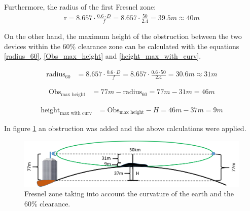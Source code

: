 Furthermore, the radius of the first Fresnel zone:
\begin{align*}
\text{r} = 8.657\cdot \frac{0.6\cdot D}{f} = 8.657\cdot \frac{50}{2.4} = 39.5m \approx 40m 
\end{align*}

On the other hand, the maximum height of the obstruction between the two devices within the 60$\%$ clearance zone can be calculated with the equations \ref{radius_60}, \ref{Obs_max_height} and \ref{height_max_with_curv}.

\begin{align}
\text{radius}_{60} &= 8.657\cdot \frac{0.6\cdot D}{f} = 8.657\cdot \frac{0.6\cdot 50}{2.4} = 30.6m \approx 31m \label{radius_60}
\end{align}

\begin{align}
\text{Obs}_{\text{max height}} &= 77m - \text{radius}_{60} = 77m - 31m = 46m \label{Obs_max_height}
\end{align}

\begin{align}
\text{height}_{\text{max with curv}} &= \text{Obs}_{\text{max height}} - H = 46m - 37m = 9m\label{height_max_with_curv}
\end{align}

In figure \ref{fig:fresnel_50km_curvature_obstacle} an obstruction was added and the above calculations were applied.  

\begin{figure}[H]
	\centering
	\includegraphics[scale=0.50]{figures/fresnel_50km_curvature_obstacle.png}
	\caption{Fresnel zone taking into account the curvature of the earth and the 60$\%$ clearance.}
	\label{fig:fresnel_50km_curvature_obstacle}
\end{figure}  

